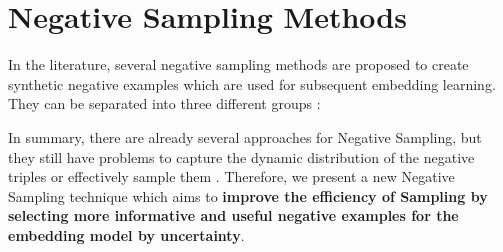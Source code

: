 \section{Negative Sampling Methods} 
\label{sec:negativesamplingmethods}

In the literature, several negative sampling methods are proposed to create synthetic negative examples which are used for subsequent embedding learning.
They can be separated into three different groups \cite{qianunderstanding}:










In summary, there are already several approaches for Negative Sampling, but they still have problems to capture the dynamic distribution of the negative triples or effectively sample them \cite{zhang2021efficient}.
Therefore, we present a new Negative Sampling technique which aims to \textbf{improve the efficiency of Sampling by selecting more informative and useful negative examples for the embedding model by uncertainty}.